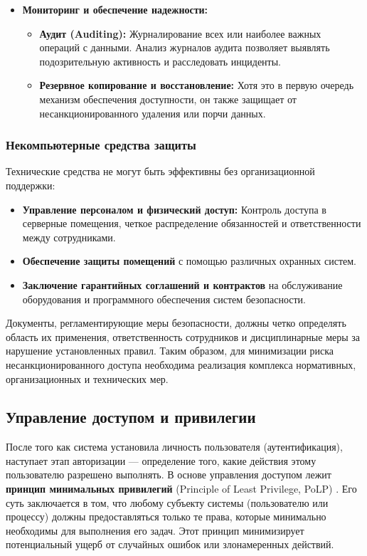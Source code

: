 \begin{itemize}
	\item \textbf{Мониторинг и обеспечение надежности:}
	\begin{itemize}
		\item \textbf{Аудит (Auditing):} Журналирование всех или наиболее важных операций с данными. Анализ журналов аудита позволяет выявлять подозрительную активность и расследовать инциденты.
		\item \textbf{Резервное копирование и восстановление:} Хотя это в первую очередь механизм обеспечения доступности, он также защищает от несанкционированного удаления или порчи данных.
	\end{itemize}
\end{itemize}

\subsubsection{Некомпьютерные средства защиты}
Технические средства не могут быть эффективны без организационной поддержки:
\begin{itemize}
	\item \textbf{Управление персоналом и физический доступ:} Контроль доступа в серверные помещения, четкое распределение обязанностей и ответственности между сотрудниками.
	\item \textbf{Обеспечение защиты помещений} с помощью различных охранных систем.
	\item \textbf{Заключение гарантийных соглашений и контрактов} на обслуживание оборудования и программного обеспечения систем безопасности.
\end{itemize}
Документы, регламентирующие меры безопасности, должны четко определять область их применения, ответственность сотрудников и дисциплинарные меры за нарушение установленных правил. Таким образом, для минимизации риска несанкционированного доступа необходима реализация комплекса нормативных, организационных и технических мер.

\subsection{Управление доступом и привилегии}
После того как система установила личность пользователя (аутентификация), наступает этап авторизации — определение того, какие действия этому пользователю разрешено выполнять. В основе управления доступом лежит \textbf{принцип минимальных привилегий} (Principle of Least Privilege, PoLP) \autocite{oracledbdoc3}. Его суть заключается в том, что любому субъекту системы (пользователю или процессу) должны предоставляться только те права, которые минимально необходимы для выполнения его задач. Этот принцип минимизирует потенциальный ущерб от случайных ошибок или злонамеренных действий.

